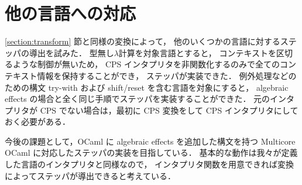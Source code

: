 \section{他の言語への対応}
\label{lang}

\ref{section:transform} 節と同様の変換によって，
他のいくつかの言語に対するステッパの導出を試みた．
型無し$\lambda$計算を対象言語とすると，
コンテキストを区切るような制御が無いため，
CPS インタプリタを非関数化するのみで全てのコンテキスト情報を保持することができ，
ステッパが実装できた．
例外処理などのための構文 try-with および shift/reset を含む言語を対象にすると，
algebraic effects の場合と全く同じ手順でステッパを実装することができた．
元のインタプリタが CPS でない場合は，最初に CPS 変換をして CPS インタプリタにしておく必要がある．

今後の課題として，OCaml に algebraic effects を追加した構文を持つ
Multicore OCaml に対応したステッパの実装を目指している．
基本的な動作は我々が定義した言語のインタプリタと同様なので，
インタプリタ関数を用意できれば変換によってステッパが導出できると考えている．
